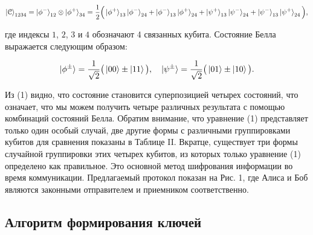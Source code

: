 \documentclass[a4paper,11pt]{article}
\begin{document}
\begin{equation*}
\ket{\mathcal{C}}_{1234} = \ket{\phi^-}_{12} \otimes \ket{\phi^+}_{34}
= \dfrac{1}{2} \Big(\ket{\phi^+}_{13} \ket{\phi^-}_{24} + 
 					\ket{\phi^-}_{13} \ket{\phi^+}_{24} +
 					\ket{\psi^+}_{13} \ket{\psi^-}_{24} +
 					\ket{\psi^-}_{13} \ket{\psi^+}_{24} \Big),
\end{equation*}

где индексы $1$, $2$, $3$ и $4$ обозначают 4 связанных кубита. Состояние Белла выражается следующим образом:

\begin{equation*}
\ket{\phi^{\pm}} = \dfrac{1}{\sqrt2}\big(\ket{00} \pm \ket{11} \big), \quad
\ket{\psi^{\pm}} = \dfrac{1}{\sqrt2}\big(\ket{01} \pm \ket{10} \big).
\end{equation*}


Из (1) видно, что состояние становится суперпозицией четырех состояний, что означает, что мы можем получить четыре различных результата с помощью комбинаций состояний Белла. Обратим внимание, что уравнение (1) представляет только один особый случай, две другие формы с различными группировками кубитов для сравнения показаны в Таблице II. Вкратце, существует три формы случайной группировки этих четырех кубитов, из которых только уравнение (1) определено как правильное. Это основной метод шифрования информации во время коммуникации. Предлагаемый протокол показан на Рис. 1, где Алиса и Боб являются законными отправителем и приемником соответственно.

\subsection{Алгоритм формирования ключей}
\end{document}
